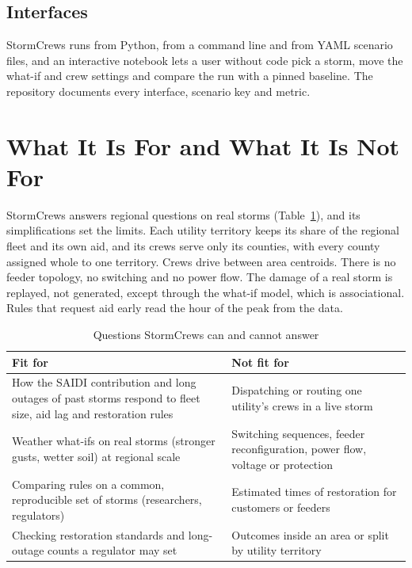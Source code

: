 \documentclass[conference,letterpaper]{IEEEtran}
\begin{document}
\subsection{Interfaces}

StormCrews runs from Python, from a command line and from YAML scenario files, and an interactive notebook lets a
user without code pick a storm, move the what-if and crew settings and compare the run with a pinned baseline. The repository documents every interface, scenario key and metric.

\section{What It Is For and What It Is Not For}\label{sec:use}

StormCrews answers regional questions on real storms (Table~\ref{tab:use}), and its simplifications set the limits.
Each utility territory keeps its share of the regional fleet and its own aid, and its crews serve only its counties,
with every county assigned whole to one territory. Crews drive between area centroids. There is no feeder topology, no switching
and no power flow. The damage of a real storm is replayed, not generated, except through the what-if model, which is
associational. Rules that request aid early read the hour of the peak from the data.

\begin{table}[t]
\caption{Questions StormCrews can and cannot answer}
\label{tab:use}
\centering\scriptsize
\setlength{\tabcolsep}{3pt}
\begin{tabular}{@{}p{}p{}@{}}
\toprule
Fit for & Not fit for \\
\midrule
How the SAIDI contribution and long outages of past storms respond to fleet size, aid lag and restoration rules &
Dispatching or routing one utility's crews in a live storm \\
Weather what-ifs on real storms (stronger gusts, wetter soil) at regional scale &
Switching sequences, feeder reconfiguration, power flow, voltage or protection \\
Comparing rules on a common, reproducible set of storms (researchers, regulators) &
Estimated times of restoration for customers or feeders \\
Checking restoration standards and long-outage counts a regulator may set &
Outcomes inside an area or split by utility territory \\
\bottomrule
\end{tabular}
\end{table}
\end{document}
